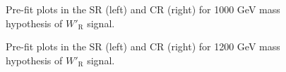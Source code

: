 \begin{figure}[H]
  \centering
  \caption{Pre-fit plots in the SR (left) and CR (right) for 1000 GeV mass hypothesis of $W'_{\text{R}}$ signal.}
  \label{fig:Prefit_WpRH1000_Asimov}
\end{figure}
\begin{figure}[H]
  \centering
  \caption{Pre-fit plots in the SR (left) and CR (right) for 1200 GeV mass hypothesis of $W'_{\text{R}}$ signal.}
  \label{fig:Prefit_WpRH1200_Asimov}
\end{figure}

